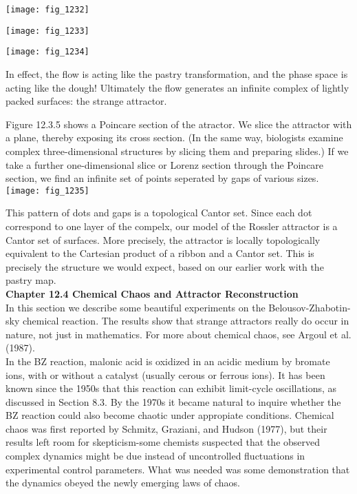 \documentclass{article}
\newcommand\tab[1][1cm]{\hspace*{#1}}
\begin{document}
\texttt{[image: fig\_1232]}

\texttt{[image: fig\_1233]}

\texttt{[image: fig\_1234]}

\tab In effect, the flow is acting like the pastry transformation, and the phase space is acting like the dough! Ultimately the flow generates an infinite complex of lightly packed surfaces: the strange attractor. \\ \tab

Figure 12.3.5 shows a Poincare section of the atractor. We slice the attractor with a plane, thereby exposing its cross section. (In the same way, biologists examine complex three-dimensional structures by slicing them and preparing slides.) If we take a further one-dimensional slice or Lorenz section through the Poincare section, we find an infinite set of points seperated by gaps of various sizes. \\ 

\texttt{[image: fig\_1235]}

\tab This pattern of dots and gaps is a topological Cantor set. Since each dot correspond to one layer of the compelx, our model of the Rossler attractor is a Cantor set of surfaces. More precisely, the attractor is locally topologically equivalent to the Cartesian product of a ribbon and a Cantor set. This is precisely the structure we would expect, based on our earlier work with the pastry map. \\

\textbf {Chapter 12.4 Chemical Chaos and Attractor Reconstruction} \\

In this section we describe some beautiful experiments on the Belousov-Zhabotin-sky chemical reaction. The results show that strange attractors really do occur in nature, not just in mathematics. For more about chemical chaos, see Argoul et al. (1987). \\ \tab
In the BZ reaction, malonic acid is oxidized in an acidic medium by bromate ions, with or without a catalyst (usually cerous or ferrous ions). It has been known since the 1950s that this reaction can exhibit limit-cycle oscillations, as discussed in Section 8.3. By the 1970s it became natural to inquire whether the BZ reaction could also become chaotic under appropiate conditions. Chemical chaos was first reported by Schmitz, Graziani, and Hudson (1977), but their results left room for skepticism-some chemists suspected that the observed complex dynamics might be due instead of uncontrolled fluctuations in experimental control parameters. What was needed was some demonstration that the dynamics obeyed the newly emerging laws of chaos. \\ \tab
\end{document}
